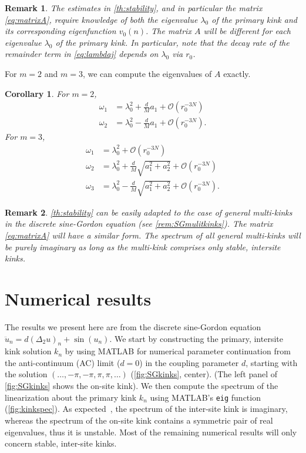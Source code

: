 \documentclass[12pt,reqno]{amsart}
\newtheorem{corollary}{Corollary}
\newtheorem{remark}{Remark}
\begin{document}
\begin{remark}\label{remark:kk}
The estimates in \cref{th:stability}, and in particular the matrix \cref{eq:matrixA}, require knowledge of both the eigenvalue $\lambda_0$ of the primary kink and its corresponding eigenfunction $v_0(n)$. The matrix $A$ will be different for each eigenvalue $\lambda_0$ of the primary kink. In particular, note that the decay rate of the remainder term in \cref{eq:lambdaj} depends on $\lambda_0$ via $r_0$.
\end{remark}

\noindent For $m = 2$ and $m = 3$, we can compute the eigenvalues of $A$ exactly.

\begin{corollary}\label{corr:m23}
For $m = 2$, 
\begin{align*}
	\omega_1 &= \lambda_0^2 + \frac{d}{M}a_1 + \mathcal{O}(r_0^{-3N}) \\
	\omega_2 &= \lambda_0^2 - \frac{d}{M}a_1 + \mathcal{O}(r_0^{-3N}).
\end{align*}
For $m = 3$,
\begin{align*}
	\omega_1 &= \lambda_0^2 + \mathcal{O}(r_0^{-3N}) \\
	\omega_2 &= \lambda_0^2 + \frac{d}{M}\sqrt{a_1^2 + a_2^2} + \mathcal{O}(r_0^{-3N}) \\
	\omega_3 &= \lambda_0^2 - \frac{d}{M}\sqrt{a_1^2 + a_2^2} + \mathcal{O}(r_0^{-3N}).
\end{align*}
\end{corollary}

\begin{remark}
\cref{th:stability} can be easily adapted to the case of general multi-kinks in the discrete sine-Gordon equation (see \cref{rem:SGmulitkinks}). The matrix \cref{eq:matrixA} will have a similar form. The spectrum of all general multi-kinks will be purely imaginary as long as the multi-kink comprises only stable, intersite kinks.
\end{remark}

\section{Numerical results}\label{sec:numerics}

The results we present here are from the discrete sine-Gordon equation
$
\ddot{u}_n = d (\Delta_2 u)_n + \sin(u_n)
$.
We start by constructing the primary, intersite kink solution $k_n$ by using MATLAB for numerical parameter continuation from the anti-continuum (AC) limit ($d = 0$) in the coupling parameter $d$, starting with the solution $(\dots, -\pi, -\pi, \pi, \pi, \dots)$ (\cref{fig:SGkinks}, center). (The left panel of \cref{fig:SGkinks} shows the on-site kink). We then compute the spectrum of the linearization about the primary kink $k_n$ using MATLAB's \texttt{eig} function (\cref{fig:kinkspec}). As expected~\cites{Balmforth2000,KevrekidisWeinstein2000}, the spectrum of the inter-site kink is imaginary, whereas the spectrum of the on-site kink contains a symmetric pair of real eigenvalues, thus it is unstable. Most of the remaining numerical results will only concern stable, inter-site kinks.
\end{document}
